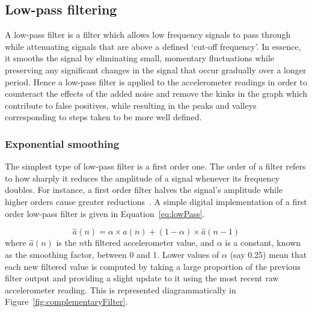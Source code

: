 \documentclass[main.tex]{subfiles}
\begin{document}
\subsection{Low-pass filtering}

A low-pass filter is a filter which allows low frequency signals to pass through while attenuating signals that are above a defined `cut-off frequency'. In essence, it smooths the signal by eliminating small, momentary fluctuations while preserving any significant changes in the signal that occur gradually over a longer period. Hence a low-pass filter is applied to the accelerometer readings in order to counteract the effects of the added noise and remove the kinks in the graph which contribute to false positives, while resulting in the peaks and valleys corresponding to steps taken to be more well defined. 

\subsubsection{Exponential smoothing}

The simplest type of low-pass filter is a first order one. The order of a filter refers to how sharply it reduces the amplitude of a signal whenever its frequency doubles. For instance, a first order filter halves the signal's amplitude while higher orders cause greater reductions~\cite[p.2528]{casiez20121}. A simple digital implementation of a first order low-pass filter is given in Equation~\ref{eq:lowPass}.   

\begin{equation}\label{eq:lowPass}
\hat{a}(n) = \alpha \times a(n) + (1 - \alpha) \times \hat{a}(n-1)
\end{equation}
where $\hat{a}(n)$ is the $n$th filtered accelerometer value, and $\alpha$ is a constant, known as the smoothing factor, between 0 and 1. Lower values of $\alpha$ (say 0.25) mean that each new filtered value is computed by taking a large proportion of the previous filter output and providing a slight update to it using the most recent raw accelerometer reading. This is represented diagrammatically in Figure~\ref{fig:complementaryFilter}.  
\end{document}
